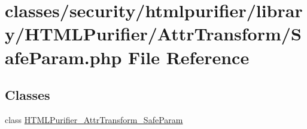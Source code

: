 \hypertarget{SafeParam_8php}{\section{classes/security/htmlpurifier/library/\+H\+T\+M\+L\+Purifier/\+Attr\+Transform/\+Safe\+Param.php File Reference}
\label{SafeParam_8php}
}
\subsection*{Classes}
\begin{DoxyCompactItemize}
\item 
class \hyperlink{classHTMLPurifier__AttrTransform__SafeParam}{H\+T\+M\+L\+Purifier\+\_\+\+Attr\+Transform\+\_\+\+Safe\+Param}
\end{DoxyCompactItemize}

